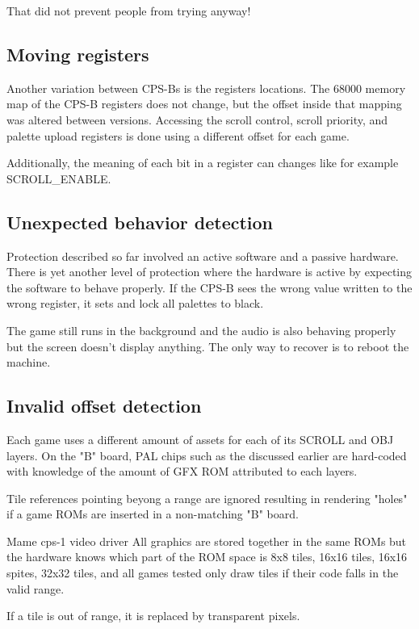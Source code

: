 That did not prevent people from trying anyway\cite{strider_conversion}!

\subsection{Moving registers}
Another variation between CPS-Bs is the registers locations. The 68000 memory map of the CPS-B registers does not change, but the offset inside that mapping was altered between versions. Accessing the scroll control, scroll priority, and palette upload registers is done using a different offset for each game.

Additionally, the meaning of each bit in a register can changes like for example SCROLL\_ENABLE.




\subsection{Unexpected behavior detection}
Protection described so far involved an active software and a passive hardware. There is yet another level of protection where the hardware is active by expecting the software to behave properly. If the CPS-B sees the wrong value written to the wrong register, it sets and lock all palettes to black. 

The game still runs in the background and the audio is also behaving properly but the screen doesn't display anything. The only way to recover is to reboot the machine\cite{petitSecurity}.

\subsection{Invalid offset detection}

Each game uses a different amount of assets for each of its SCROLL and OBJ layers. On the "B" board, PAL chips such as the  discussed earlier are hard-coded with knowledge of the amount of GFX ROM attributed to each layers.

Tile references pointing beyong a range are ignored resulting in rendering "holes" if a game ROMs are inserted in a non-matching "B" board.

\begin{q}{Mame cps-1 video driver}
All graphics are
stored together in the same ROMs but the hardware knows which part of the ROM space
is 8x8 tiles, 16x16 tiles, 16x16 spites, 32x32 tiles, and all games tested only
draw tiles if their code falls in the valid range. 

If a tile is out of range, it is replaced by transparent pixels.
\end{q}


